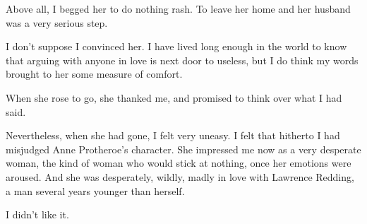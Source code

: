 Above all, I begged her to do nothing rash. To leave her home and her husband was a very serious step.

I don't suppose I convinced her. I have lived long enough in the world to know that arguing with anyone in love is next door to useless, but I do think my words brought to her some measure of comfort.

When she rose to go, she thanked me, and promised to think over what I had said.

Nevertheless, when she had gone, I felt very uneasy. I felt that hitherto I had misjudged Anne Protheroe's character. She impressed me now as a very desperate woman, the kind of woman who would stick at nothing, once her emotions were aroused. And she was desperately, wildly, madly in love with Lawrence Redding, a man several years younger than herself.

I didn't like it.